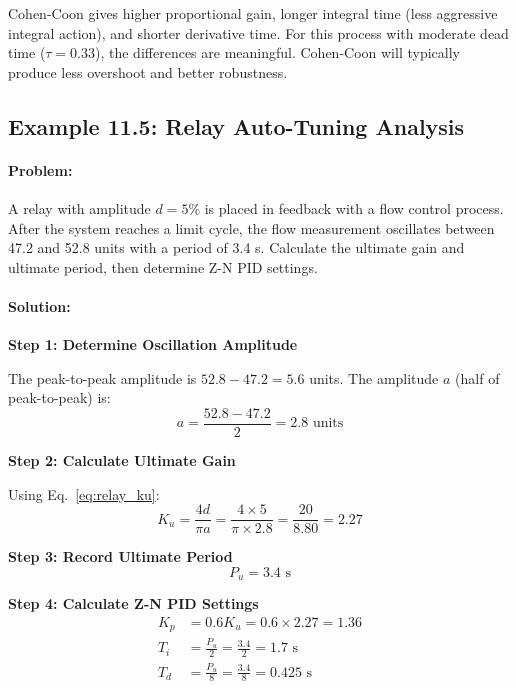 Cohen-Coon gives higher proportional gain, longer integral time (less aggressive integral action), and shorter derivative time. For this process with moderate dead time ($\tau = 0.33$), the differences are meaningful. Cohen-Coon will typically produce less overshoot and better robustness.

\hrulefill

\subsection{Example 11.5: Relay Auto-Tuning Analysis}

\paragraph{Problem:} A relay with amplitude $d = 5\%$ is placed in feedback with a flow control process. After the system reaches a limit cycle, the flow measurement oscillates between 47.2 and 52.8 units with a period of 3.4 s. Calculate the ultimate gain and ultimate period, then determine Z-N PID settings.

\paragraph{Solution:}

\textbf{Step 1: Determine Oscillation Amplitude}

The peak-to-peak amplitude is $52.8 - 47.2 = 5.6$ units.
The amplitude $a$ (half of peak-to-peak) is:
\begin{equation}
    a = \frac{52.8 - 47.2}{2} = 2.8 \text{ units}
\end{equation}

\textbf{Step 2: Calculate Ultimate Gain}

Using Eq.~\eqref{eq:relay_ku}:
\begin{equation}
    K_u = \frac{4d}{\pi a} = \frac{4 \times 5}{\pi \times 2.8} = \frac{20}{8.80} = 2.27
\end{equation}

\textbf{Step 3: Record Ultimate Period}
\begin{equation}
    P_u = 3.4 \text{ s}
\end{equation}

\textbf{Step 4: Calculate Z-N PID Settings}
\begin{align}
    K_p &= 0.6 K_u = 0.6 \times 2.27 = 1.36 \\
    T_i &= \frac{P_u}{2} = \frac{3.4}{2} = 1.7 \text{ s} \\
    T_d &= \frac{P_u}{8} = \frac{3.4}{8} = 0.425 \text{ s}
\end{align}

